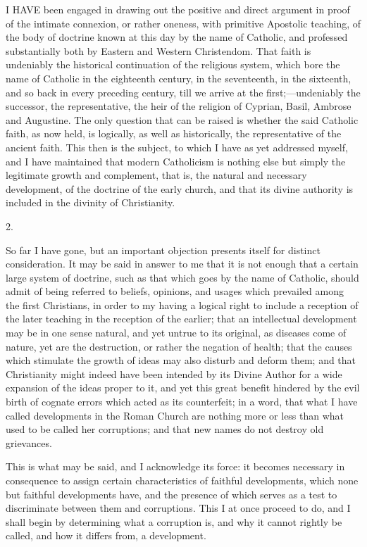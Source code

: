 I HAVE been engaged in drawing out the positive and
direct argument in proof of the intimate connexion, or
rather oneness, with primitive Apostolic teaching, of the
body of doctrine known at this day by the name of
Catholic, and professed substantially both by Eastern and
Western Christendom. That faith is undeniably the
historical continuation of the religious system, which
bore the name of Catholic in the eighteenth century, in
the seventeenth, in the sixteenth, and so back in every
preceding century, till we arrive at the
first;—undeniably the successor, the representative,
the heir of the religion of Cyprian, Basil, Ambrose and
Augustine. The only question that can be raised is
whether the said Catholic faith, as now held, is
logically, as well as historically, the representative of
the ancient faith. This then is the subject, to which I
have as yet addressed myself, and I have maintained that
modern Catholicism is nothing else but simply the
legitimate growth and complement, that is, the natural
and necessary development, of the doctrine of the early
church, and that its divine authority is included in the
divinity of Christianity.

2.

So far I have gone, but an important objection
presents itself for distinct consideration. It may be
said in answer to me that it is not enough that a certain
large system of doctrine, such as that which goes by the
name of Catholic, should admit of being referred to
beliefs, opinions, and usages which prevailed among the
first Christians, in order to my having a logical right
to include a reception of the later teaching in the
reception of the earlier; that an intellectual
development may be in one sense natural, and yet untrue
to its original, as diseases come of nature, yet are the
destruction, or rather the negation of health; that the
causes which stimulate the growth of ideas may also
disturb and deform them; and that Christianity might
indeed have been intended by its Divine Author for a wide
expansion of the ideas proper to it, and yet this great
benefit hindered by the evil birth of cognate errors
which acted as its counterfeit; in a word, that what I
have called developments in the Roman Church are nothing
more or less than what used to be called her corruptions;
and that new names do not destroy old grievances.

This is what may be said, and I acknowledge its force:
it becomes necessary in consequence to assign certain
characteristics of faithful developments, which none but
faithful developments have, and the presence of which
serves as a test to discriminate between them and
corruptions. This I at once proceed to do, and I shall
begin by determining what a corruption is, and why it
cannot rightly be called, and how it differs from, a
development.

